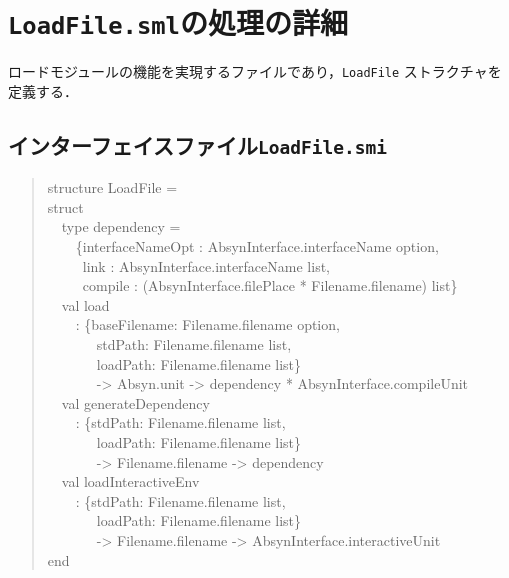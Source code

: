 \documentclass{jbook}
\newif\ifjp
\newcommand{\txt}[2]{#1}
\newcommand{\code}[1]{\mbox{\large\tt #1}}
\newcommand{\myem}{\mbox{\ \ }}
\newenvironment{program}{\begin{quote}\begin{tt}}%
                        {\end{tt}\end{quote}}
\begin{document}
\section{\txt{\code{LoadFile.sml}の処理の詳細}{The details of \code{LoadFile.sml}}}
\ifjp%

	ロードモジュールの機能を実現するファイルであり，\code{LoadFile}
ストラクチャを定義する．

\subsection{インターフェイスファイル\code{LoadFile.smi}}
\begin{program}
structure LoadFile =\\
struct\\
\myem  type dependency =\\
\myem\myem      \{interfaceNameOpt : AbsynInterface.interfaceName option,\\
\myem\myem\      link : AbsynInterface.interfaceName list,\\
\myem\myem\      compile : (AbsynInterface.filePlace * Filename.filename) list\}\\
\myem  val load\\
\myem\myem      : \{baseFilename: Filename.filename option,\\
\myem\myem\myem\         stdPath: Filename.filename list,\\
\myem\myem\myem\         loadPath: Filename.filename list\}\\
\myem\myem\myem\       -> Absyn.unit -> dependency * AbsynInterface.compileUnit\\
\myem  val generateDependency\\
\myem\myem      : \{stdPath: Filename.filename list,\\
\myem\myem\myem\         loadPath: Filename.filename list\}\\
\myem\myem\myem\        -> Filename.filename -> dependency\\
\myem  val loadInteractiveEnv\\
\myem\myem      : \{stdPath: Filename.filename list,\\
\myem\myem\myem\        loadPath: Filename.filename list\}\\
\myem\myem\myem\        -> Filename.filename -> AbsynInterface.interactiveUnit\\
end
\end{program}
\end{document}
